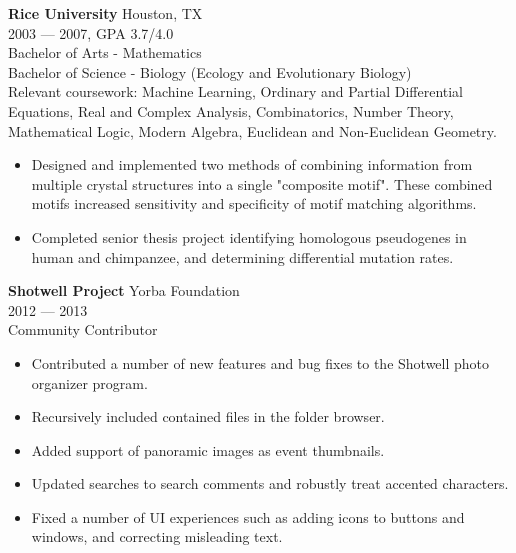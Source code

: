 \clearpage
\myfontsize{\bigheader}
\textbf{Rice University}
\myfontsize{\bodysize}
Houston, TX\\
2003 --- 2007, GPA 3.7/4.0\\
Bachelor of Arts - Mathematics\\
Bachelor of Science - Biology (Ecology and Evolutionary Biology)\\
Relevant coursework: Machine Learning, Ordinary and Partial Differential Equations, Real and Complex Analysis, Combinatorics, Number Theory, Mathematical Logic, Modern Algebra, Euclidean and Non-Euclidean Geometry.
\begin{itemize}[topsep=1ex, partopsep=0ex, parsep=0ex, itemsep=0.5ex]
    \item Designed and implemented two methods of combining information from multiple crystal structures into a single "composite motif". These combined motifs increased sensitivity and specificity of motif matching algorithms.
    \item Completed senior thesis project identifying homologous pseudogenes in human and chimpanzee, and determining differential mutation rates.
\end{itemize}

\myfontsize{\bigheader}
\textbf{Shotwell Project}
\myfontsize{\bodysize}
Yorba Foundation\\
2012 --- 2013\\
Community Contributor\\
\begin{itemize}[topsep=1ex, partopsep=0ex, parsep=0ex, itemsep=0.5ex]
    \item Contributed a number of new features and bug fixes to the Shotwell photo organizer program.
    \item Recursively included contained files in the folder browser.
    \item Added support of panoramic images as event thumbnails.
    \item Updated searches to search comments and robustly treat accented characters.
    \item Fixed a number of UI experiences such as adding icons to buttons and windows, and correcting misleading text.
\end{itemize}


